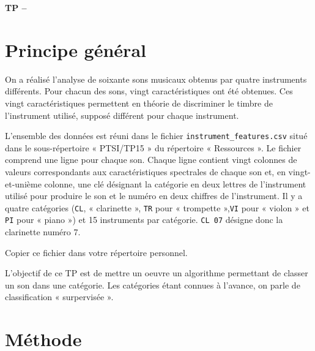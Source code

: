 

%



\begin{center}
{\Large\bf TP \no {\numero} -- \descrip}
\end{center}
 
\section{Principe général}

On a réalisé l'analyse de soixante sons musicaux obtenus par quatre instruments différents. Pour chacun des sons, vingt caractéristiques ont été obtenues. Ces vingt caractéristiques permettent en théorie de discriminer le timbre de l'instrument utilisé, supposé différent pour chaque instrument.

L'ensemble des données est réuni dans le fichier \verb|instrument_features.csv| situé dans le sous-répertoire « PTSI/TP15 » du répertoire « Ressources ». Le fichier comprend une ligne pour chaque son. Chaque ligne contient vingt colonnes de valeurs correspondants aux caractéristiques spectrales de chaque son et, en vingt-et-unième colonne, une clé désignant la catégorie en deux lettres de l'instrument utilisé pour produire le son et le numéro en deux chiffres de l'instrument. Il y a quatre catégories (\texttt{CL}, « clarinette », \texttt{TR} pour « trompette »,\texttt{VI} pour « violon » et \texttt{PI} pour « piano ») et 15 instruments par catégorie. \texttt{CL 07} désigne donc la clarinette numéro 7.

Copier ce fichier dans votre répertoire personnel.

L'objectif de ce TP est de mettre un oeuvre un algorithme permettant de classer un son dans une catégorie. Les catégories étant connues à l'avance, on parle de classification « surpervisée ».

\section{Méthode}

